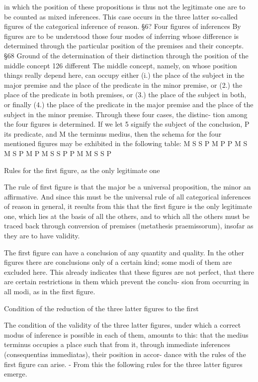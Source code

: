 in which the position of these propositions is thus not the legitimate one
are to be counted as mixed inferences. This case occurs in the three latter
so-called figures of the categorical inference of reason.
§6?
Four figures of inferences
By figures are to be understood those four modes of inferring whose
difference is determined through the particular position of the premises
and their concepts.
§68
Ground of the determination of their distinction through the
position of the middle concept
126
different
The middle concept, namely, on whose position things really depend
here, can occupy either (i.) the place of the subject in the major premise
and the place of the predicate in the minor premise, or (2.) the place of the
predicate in both premises, or (3.) the place of the subject in both, or
finally (4.) the place of the predicate in the major premise and the place of
the subject in the minor premise. Through these four cases, the distinc-
tion among the four figures is determined. If we let 5 signify the subject of
the conclusion, P its predicate, and M the terminus medius, then the
schema for the four mentioned figures may be exhibited in the following
table:
M
S
S
P
M
P
P M
S M
S P
M P
M S
S P
P M
M S
S P

Rules for the first figure, as the only legitimate one

The rule of first figure is that
the major be a universal proposition,
the minor an affirmative.
And since this must be the universal rule of
all categorical inferences of reason in general,
it results from this that the first figure is the only legitimate one,
which lies at the basis of all the others, and to which all the others
must be traced back through conversion of premises (metathesis praemissorum),
insofar as they are to have validity.

    The first figure can have a conclusion of any quantity and quality. In the
    other figures there are conclusions only of a certain kind; some modi of
    them are excluded here. This already indicates that these figures are not
    perfect, that there are certain restrictions in them which prevent the conclu-
    sion from occurring in all modi, as in the first figure.

Condition of the reduction of the three latter figures to the first

The condition of the validity of the three latter figures, under which a
correct modus of inference is possible in each of them, amounts to this:
that the medius terminus occupies a place such that from it, through
immediate inferences (consequentias immediatas), their position in accor-
dance with the rules of the first figure can arise. -
From this the following rules for the three latter figures emerge.

